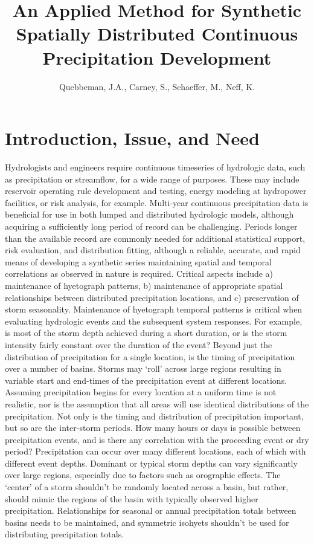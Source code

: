 \documentclass[11pt]{article} %
\title{An Applied Method for Synthetic Spatially Distributed Continuous Precipitation Development}
\author{Quebbeman, J.A., Carney, S., Schaeffer, M., Neff, K.}
\begin{document}
\maketitle

\section{Introduction, Issue, and Need}

Hydrologists and engineers require continuous timeseries of hydrologic data, such as precipitation or streamflow, for a wide range of purposes. These may include reservoir operating rule development and testing, energy modeling at hydropower facilities, or risk analysis, for example. Multi-year continuous precipitation data is beneficial for use in both lumped and distributed hydrologic models, although acquiring a sufficiently long period of record can be challenging.
Periods longer than the available record are commonly needed for additional statistical support, risk evaluation, and distribution fitting, although a reliable, accurate, and rapid means of developing a synthetic series maintaining spatial and temporal correlations as observed in nature is required. Critical aspects include a) maintenance of hyetograph patterns, b) maintenance of appropriate spatial relationships between distributed precipitation locations, and c) preservation of storm seasonality.
Maintenance of hyetograph temporal patterns is critical when evaluating hydrologic events and the subsequent system responses. For example, is most of the storm depth achieved during a short duration, or is the storm intensity fairly constant over the duration of the event?  Beyond just the distribution of precipitation for a single location, is the timing of precipitation over a number of basins. Storms may ‘roll’ across large regions resulting in variable start and end-times of the precipitation event at different locations. Assuming precipitation begins for every location at a uniform time is not realistic, nor is the assumption that all areas will use identical distributions of the precipitation.
Not only is the timing and distribution of precipitation important, but so are the inter-storm periods. How many hours or days is possible between precipitation events, and is there any correlation with the proceeding event or dry period?
Precipitation can occur over many different locations, each of which with different event depths. Dominant or typical storm depths can vary significantly over large regions, especially due to factors such as orographic effects. The ‘center’ of a storm shouldn’t be randomly located across a basin, but rather, should mimic the regions of the basin with typically observed higher precipitation. Relationships for seasonal or annual precipitation totals between basins needs to be maintained, and symmetric isohyets shouldn’t be used for distributing precipitation totals.
	
\end{document}
